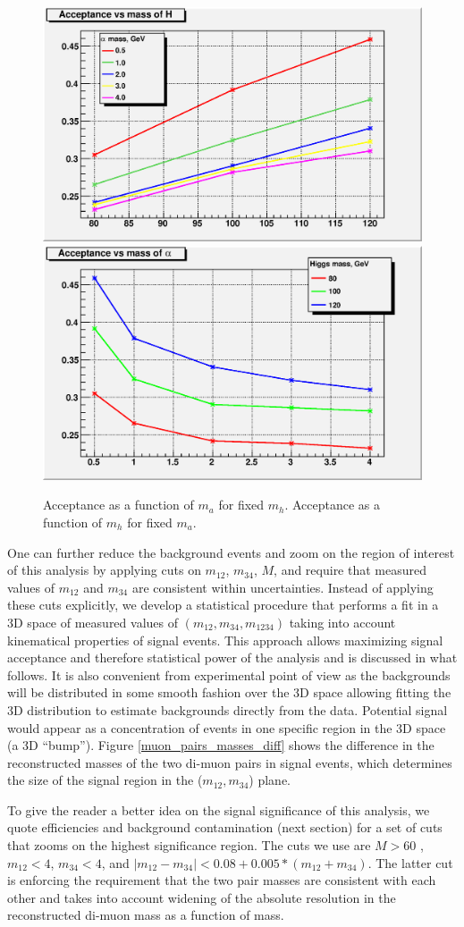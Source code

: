 \documentclass[aps,12pt,superscriptaddress,nofootinbib,floatfix,showpacs]{revtex4}
\begin{document}
\begin{figure}[htb]
\begin{center}
\includegraphics[width=0.48\linewidth]{plots/acceptance_H.eps}
\includegraphics[width=0.48\linewidth]{plots/acceptance_a.eps}
\caption{Acceptance as a function of $m_a$ for fixed $m_h$. Acceptance as a function of $m_h$ for fixed $m_a$.}
\label{signal_acceptance}
\end{center}
\end{figure}

One can further reduce the background events and zoom on the region of interest of
this analysis by applying cuts on $m_{12}$, $m_{34}$, $M$, and require that measured
values of $m_{12}$ and $m_{34}$ are consistent within  uncertainties. Instead of
applying these cuts explicitly, we develop a statistical procedure that performs a fit
in  a 3D space of measured values of $(m_{12},m_{34}, m_{1234})$ taking into account
kinematical properties of  signal events. This approach allows maximizing signal
acceptance and therefore statistical power of the analysis and is discussed in what
follows. It is also convenient from experimental point of view as the backgrounds
will  be distributed in some smooth fashion over the 3D space allowing fitting the 3D
distribution to estimate  backgrounds directly from the data. Potential signal would
appear as a concentration of events in one specific  region in the 3D space (a 3D
``bump''). Figure \ref{muon_pairs_masses_diff} shows the difference in the 
reconstructed masses of the two di-muon pairs in signal events, which determines the
size of the signal region  in the ($m_{12}, m_{34}$) plane.

To give the reader a better idea on the signal significance of this analysis, we quote
efficiencies and  background contamination (next section) for a set of cuts that zooms
on the highest significance region.  The cuts we use are $M>60$ \gevcc, $m_{12} < 4$,
$m_{34} < 4$, and $|m_{12}-m_{34}|<0.08+0.005*(m_{12}+m_{34})$.  The latter cut is
enforcing the requirement that the two pair masses are consistent with each other and 
takes into account widening of the absolute resolution in the reconstructed di-muon
mass as a function of mass. 
\end{document}
